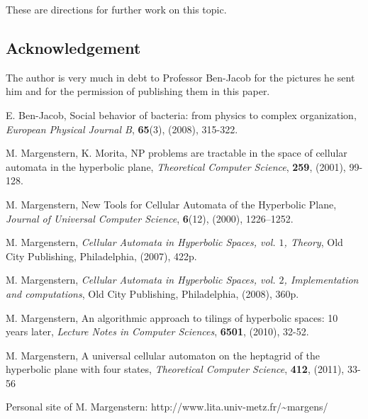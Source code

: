 \documentclass{article}
\begin{document}
   These are directions for further work on this topic.

\subsection*{Acknowledgement}
The author is very much in debt to Professor Ben-Jacob for the pictures
he sent him and for the permission of publishing them in this paper.

\begin{thebibliography}{5}
E. Ben-Jacob,
Social behavior of bacteria: from physics to complex organization,
{\it European Physical Journal B}, {\bf 65}(3), (2008), 315-322.

M. Margenstern, K. Morita,
NP problems are tractable in the space of cellular automata in the
hyperbolic plane,
{\it Theoretical Computer Science},
{\bf 259}, (2001), 99-128.

M. Margenstern,
New Tools for Cellular Automata of the Hyperbolic Plane,
{\it Journal of Universal Computer Science},
{\bf 6}(12), (2000), 1226--1252.

M. Margenstern,
{\it Cellular Automata in Hyperbolic Spaces, vol. $1$, Theory},
Old City Publishing, Philadelphia, (2007), 422p.

M. Margenstern,
{\it Cellular Automata in Hyperbolic Spaces, vol. $2$, Implementation and
computations},
Old City Publishing, Philadelphia, (2008), 360p.

M. Margenstern,
An algorithmic approach to tilings of hyperbolic spaces:
10 years later,
{\it Lecture Notes in Computer Sciences}, {\bf 6501}, (2010), 32-52.

M. Margenstern,
A universal cellular automaton on the heptagrid of the hyperbolic plane with four states,
{\it Theoretical Computer Science}, {\bf 412}, (2011), 33-56

Personal site of M. Margenstern:\vskip 0pt
http://www.lita.univ-metz.fr/\~{}margens/

\end{thebibliography}
\end{document}
